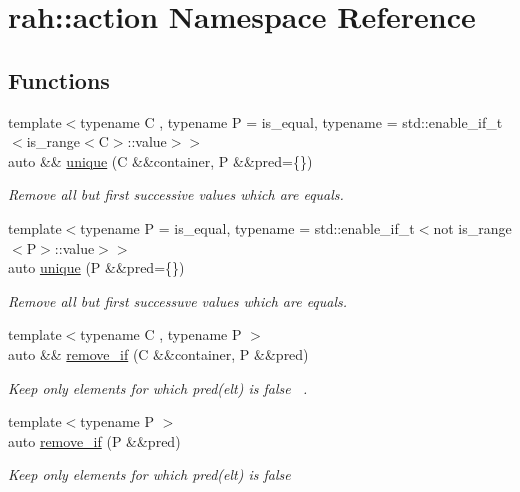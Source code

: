 \hypertarget{namespacerah_1_1action}{}\section{rah\+::action Namespace Reference}
\label{namespacerah_1_1action}
\subsection*{Functions}
\begin{DoxyCompactItemize}
\item 
{\footnotesize template$<$typename C , typename P  = is\+\_\+equal, typename  = std\+::enable\+\_\+if\+\_\+t$<$is\+\_\+range$<$\+C$>$\+::value$>$$>$ }\\auto \&\& \mbox{\hyperlink{namespacerah_1_1action_a77387ae50600982d52d0d41623747b84}{unique}} (C \&\&container, P \&\&pred=\{\})
\begin{DoxyCompactList}\small\item\em Remove all but first successive values which are equals. \end{DoxyCompactList}\item 
{\footnotesize template$<$typename P  = is\+\_\+equal, typename  = std\+::enable\+\_\+if\+\_\+t$<$not is\+\_\+range$<$\+P$>$\+::value$>$$>$ }\\auto \mbox{\hyperlink{namespacerah_1_1action_a2b3773f4b775a1e64307307556af24cd}{unique}} (P \&\&pred=\{\})
\begin{DoxyCompactList}\small\item\em Remove all but first successuve values which are equals. \end{DoxyCompactList}\item 
{\footnotesize template$<$typename C , typename P $>$ }\\auto \&\& \mbox{\hyperlink{namespacerah_1_1action_ab774cddf0da3ae6a4b505d8a2e05b0c7}{remove\+\_\+if}} (C \&\&container, P \&\&pred)
\begin{DoxyCompactList}\small\item\em Keep only elements for which pred(elt) is false~\newline
. \end{DoxyCompactList}\item 
{\footnotesize template$<$typename P $>$ }\\auto \mbox{\hyperlink{namespacerah_1_1action_a708ce68c6ed2b20ef9c0cdb6b697c980}{remove\+\_\+if}} (P \&\&pred)
\begin{DoxyCompactList}\small\item\em Keep only elements for which pred(elt) is false~\newline

\end{DoxyCompactList}
\end{DoxyCompactItemize}

